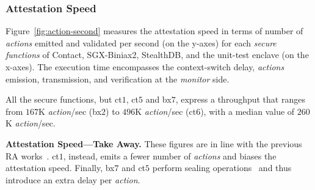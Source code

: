 
\subsubsection{Attestation Speed}
\label{ssec:attesation-speed}

Figure~\ref{fig:action-second} measures the attestation speed in terms of 
number of \emph{actions} emitted and validated per second (on the y-axes) for 
each \emph{secure functions} of \textsf{Contact}, \textsf{SGX-Biniax2}, 
\textsf{StealthDB}, and the \textsf{unit-test} enclave (on the x-axes).
The execution time encompasses the context-switch delay, \emph{actions} 
emission, transmission, and verification at the \emph{monitor} side.

All the secure functions, but ct$1$, ct$5$ and bx$7$, express a throughput
that ranges from $167$K \emph{action}/sec (bx$2$) to $496$K 
\emph{action}/sec (ct$6$), with a median value of $260$K \emph{action}/sec.

\vspace{0.5cm}
\noindent \textbf{Attestation Speed---Take Away.}
These figures are in line with the previous RA works~\citep{scarr}.
ct$1$, instead, emits a fewer number of  \emph{actions} and biases the 
attestation speed.
Finally, bx$7$ and ct$5$ perform sealing operations~\citep{anati2013innovative} 
and thus introduce an extra delay per \emph{action}.


